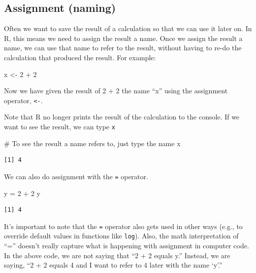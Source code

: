 \documentclass[
  letterpaper,
  DIV=11,
  numbers=noendperiod]{scrreprt}
\newenvironment{Shaded}{\begin{snugshade}}{\end{snugshade}}
\newcommand{\CommentTok}[1]{\textcolor[rgb]{0.37,0.37,0.37}{#1}}
\newcommand{\DecValTok}[1]{\textcolor[rgb]{0.68,0.00,0.00}{#1}}
\newcommand{\NormalTok}[1]{\textcolor[rgb]{0.00,0.23,0.31}{#1}}
\newcommand{\OtherTok}[1]{\textcolor[rgb]{0.00,0.23,0.31}{#1}}
\newcommand{\SpecialCharTok}[1]{\textcolor[rgb]{0.37,0.37,0.37}{#1}}
\begin{document}
\hypertarget{assignment-naming}{%
\subsection{Assignment (naming)}\label{assignment-naming}}

Often we want to save the result of a calculation so that we can use it
later on. In R, this means we need to assign the result a name. Once we
assign the result a name, we can use that name to refer to the result,
without having to re-do the calculation that produced the result. For
example:

\begin{Shaded}
\begin{Highlighting}[]
\NormalTok{x }\OtherTok{\textless{}{-}} \DecValTok{2} \SpecialCharTok{+} \DecValTok{2}
\end{Highlighting}
\end{Shaded}

Now we have given the result of 2 + 2 the name ``x'' using the
assignment operator, \texttt{\textless{}-}.

Note that R no longer prints the result of the calculation to the
console. If we want to see the result, we can type \texttt{x}

\begin{Shaded}
\begin{Highlighting}[]
\CommentTok{\# To see the result a name refers to, just type the name}
\NormalTok{x }
\end{Highlighting}
\end{Shaded}

\begin{verbatim}
[1] 4
\end{verbatim}

We can also do assignment with the \texttt{=} operator.

\begin{Shaded}
\begin{Highlighting}[]
\NormalTok{y }\OtherTok{=} \DecValTok{2} \SpecialCharTok{+} \DecValTok{2}
\NormalTok{y}
\end{Highlighting}
\end{Shaded}

\begin{verbatim}
[1] 4
\end{verbatim}

It's important to note that the \texttt{=} operator also gets used in
other ways (e.g., to override default values in functions like
\texttt{log}). Also, the math interpretation of ``='' doesn't really
capture what is happening with assignment in computer code. In the above
code, we are not saying that ``2 + 2 equals y.'' Instead, we are saying,
``2 + 2 equals 4 and I want to refer to 4 later with the name `y'.''
\end{document}
